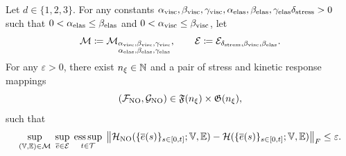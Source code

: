 \documentclass[3p, 12pt, preprint]{elsarticle}
\begin{document}
\begin{theorem}\label{thm:ua}
Let $d\in\{1,2,3\}$. For any constants $\alpha_{\rm visc},\beta_{\rm visc},\gamma_{\rm visc},\alpha_{\rm elas},\beta_{\rm elas}, \gamma_{\rm elas}\delta_{\rm stress}>0$ such that $0<\alpha_{\rm elas}\leq \beta_{\rm elas}$ and $0<\alpha_{\rm visc}\leq \beta_{\rm visc}$,  let
\begin{equation*}
{\mathcal{M}}\coloneqq{\mathcal{M}}_{\substack{\alpha_{\rm visc},\beta_{\rm visc},\gamma_{\rm visc}\\\alpha_{\rm elas},\beta_{\rm elas},\gamma_{\rm elas}}},\qquad
{\mathcal{E}}\coloneqq{\mathcal{E}}_{\delta_{\rm stress},\beta_{\rm visc},\beta_{\rm elas}}.
\end{equation*}
For any $\varepsilon>0$, there exist $n_\xi\in\mathbb{N}$ and a pair of stress and kinetic response mappings
\begin{equation*}
    ({\mathcal{F}}_{\mathrm{NO}}, {\mathcal{G}}_{\mathrm{NO}})\in \mathfrak{F}(n_\xi)\times \mathfrak{G}(n_\xi),
\end{equation*}
such that
\begin{equation}\label{eq:ua}
\sup_{ (\mathbb{V},\mathbb{E})\in{\mathcal{M}}}\;
\sup_{ \overline e\in{\mathcal{E}}}\;
\operatorname*{ess\,sup}_{  t\in{\mathcal{T}}}\;
\left\|
{\mathcal{H}}_{\mathrm{NO}}(\{\overline e(s)\}_{s\in[0,t]};\mathbb{V},\mathbb{E})
-
{\mathcal{H}}(\{\overline e(s)\}_{s\in[0,t]};\mathbb{V},\mathbb{E})
\right\|_F
\le \varepsilon.
\end{equation}
\end{theorem}
\end{document}
